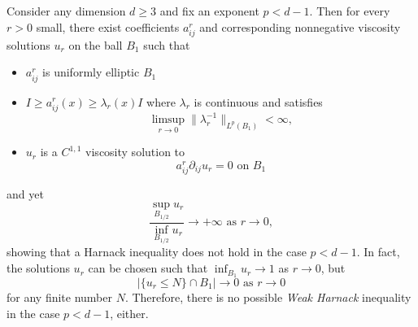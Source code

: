 \documentclass[10pt,a4paper]{amsart}
\newcommand{\ds}{\displaystyle}
\begin{document}
\begin{prop} 
\label{prop: noHarnack} Consider any dimension $d \ge 3$ and fix an exponent $p<d-1$. Then for every $r>0$ small, there exist coefficients $a_{ij}^r$ and corresponding nonnegative viscosity solutions $u_r$ on the ball $B_1$ such that 
\begin{itemize}
\item $a_{ij}^r$ is uniformly elliptic  $B_1$ 
\item $I \ge a_{ij}^r(x) \ge \lambda_r(x)  I$ where $\lambda_r$ is continuous and satisfies 
$$\ds \limsup_{r\to 0} \|\lambda_r^{-1}\|_{L^p(B_{1})}  <\infty,$$
\item $u_r$ is a $C^{1,1}$ viscosity solution to 
$$a_{ij}^r \partial_{ij}u_r = 0 \text{ on } B_{1}$$
\end{itemize}
and yet
$$\frac{\sup_{B_{1/2}}u_r}{\inf_{B_{1/2}}u_r} \to +\infty \text{ as } r\to 0,$$
showing that a Harnack inequality does not hold in the case $p<d-1$. In fact, the solutions $u_r$ can be chosen such that $\inf_{B_1} u_r \to 1$ as $r\to 0$, but 
$$| \{u_r \le N\}\cap B_1| \to 0 \text{ as } r \to 0$$
for any finite number $N$. Therefore, there is no possible \textit{Weak Harnack} inequality in the case $p<d-1$, either.
\end{prop}
\end{document}
